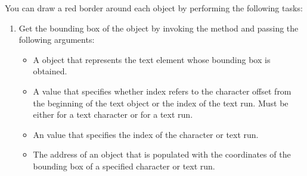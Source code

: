 \documentclass[letterpaper,12pt,english,openany,oneside]{sphinxmanual}
\begin{document}
You can draw a red border around each  object by performing the following tasks:
\begin{enumerate}
%
\item {} 
Get the bounding box of the  object by invoking the  method and passing the following arguments:
\begin{itemize}
\item {} 
A  object that represents the text element whose bounding box is obtained.

\item {} 
A  value that specifies whether index refers to the character offset from the beginning of the text object or the index of the text run. Must be either  for a text character or  for a text run.

\item {} 
An  value that specifies the index of the character or text run.

\item {} 
The address of an  object that is populated with the coordinates of the bounding box of a specified character or text run.

\end{itemize}

\end{enumerate}
\end{document}
